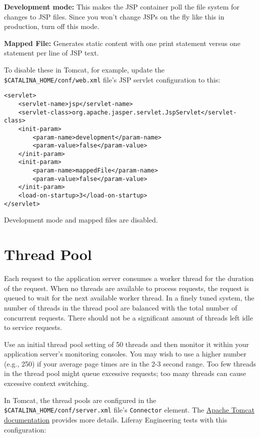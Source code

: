 \textbf{Development mode:} This makes the JSP container poll the file
system for changes to JSP files. Since you won't change JSPs on the fly
like this in production, turn off this mode.

\textbf{Mapped File:} Generates static content with one print statement
versus one statement per line of JSP text.

To disable these in Tomcat, for example, update the
\texttt{\$CATALINA\_HOME/conf/web.xml} file's JSP servlet configuration
to this:

\begin{verbatim}
<servlet>   
    <servlet-name>jsp</servlet-name>
    <servlet-class>org.apache.jasper.servlet.JspServlet</servlet-class>   
    <init-param>    
        <param-name>development</param-name>    
        <param-value>false</param-value>   
    </init-param>   
    <init-param>    
        <param-name>mappedFile</param-name>    
        <param-value>false</param-value>   
    </init-param>   
    <load-on-startup>3</load-on-startup>
</servlet>
\end{verbatim}

Development mode and mapped files are disabled.

\section{Thread Pool}\label{thread-pool}

Each request to the application server consumes a worker thread for the
duration of the request. When no threads are available to process
requests, the request is queued to wait for the next available worker
thread. In a finely tuned system, the number of threads in the thread
pool are balanced with the total number of concurrent requests. There
should not be a significant amount of threads left idle to service
requests.

Use an initial thread pool setting of 50 threads and then monitor it
within your application server's monitoring consoles. You may wish to
use a higher number (e.g., 250) if your average page times are in the
2-3 second range. Too few threads in the thread pool might queue
excessive requests; too many threads can cause excessive context
switching.

In Tomcat, the thread pools are configured in the
\texttt{\$CATALINA\_HOME/conf/server.xml} file's \texttt{Connector}
element. The
\href{https://tomcat.apache.org/tomcat-9.0-doc/config/http.html}{Apache
Tomcat documentation} provides more details. Liferay Engineering tests
with this configuration:

